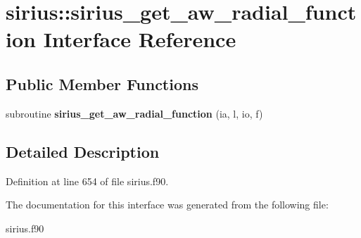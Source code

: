 \hypertarget{interfacesirius_1_1sirius__get__aw__radial__function}{}\section{sirius\+:\+:sirius\+\_\+get\+\_\+aw\+\_\+radial\+\_\+function Interface Reference}
\label{interfacesirius_1_1sirius__get__aw__radial__function}
\subsection*{Public Member Functions}
\begin{DoxyCompactItemize}
\item 
\hypertarget{interfacesirius_1_1sirius__get__aw__radial__function_a466e27f675fdcaefc2c3d37301e50eb2}{}subroutine {\bfseries sirius\+\_\+get\+\_\+aw\+\_\+radial\+\_\+function} (ia, l, io, f)\label{interfacesirius_1_1sirius__get__aw__radial__function_a466e27f675fdcaefc2c3d37301e50eb2}

\end{DoxyCompactItemize}


\subsection{Detailed Description}


Definition at line 654 of file sirius.\+f90.



The documentation for this interface was generated from the following file\+:\begin{DoxyCompactItemize}
\item 
sirius.\+f90\end{DoxyCompactItemize}
